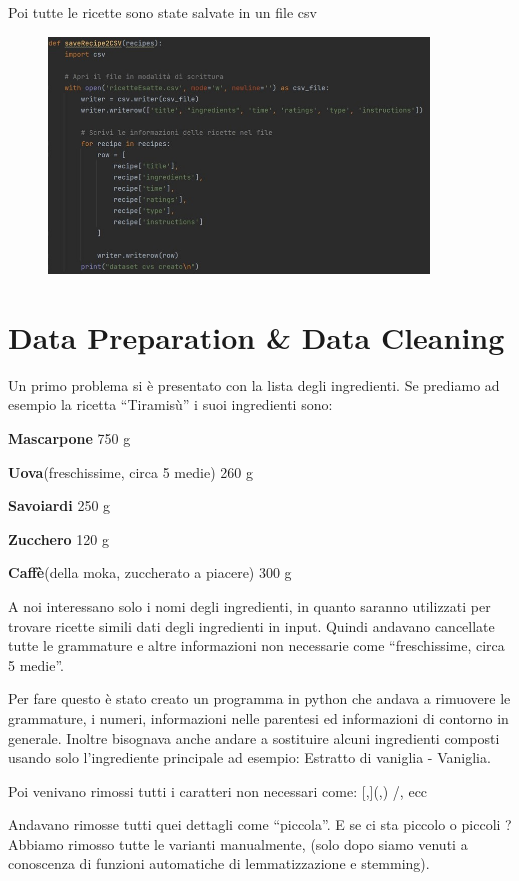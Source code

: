 \documentclass[12pt]{report}
\begin{document}
Poi tutte le ricette sono state salvate in un file csv
    \begin{figure}[H]
        \centering
        {\includegraphics[width=0.9\textwidth]{img/img3.jpg}}
    \end{figure}


\section{Data Preparation \& Data Cleaning}
Un primo problema si è presentato con la lista degli ingredienti. Se prediamo ad esempio la ricetta “Tiramisù” i suoi ingredienti sono: 

\textbf{Mascarpone} 750 g

\textbf{Uova}(freschissime, circa 5 medie) 260 g

\textbf{Savoiardi} 250 g

\textbf{Zucchero} 120 g

\textbf{Caffè}(della moka, zuccherato a piacere) 300 g

A noi interessano solo i nomi degli ingredienti, in quanto saranno utilizzati per trovare ricette simili dati degli ingredienti in input. Quindi andavano cancellate tutte le grammature e altre informazioni non necessarie come “freschissime, circa 5 medie”.

Per fare questo è stato creato un programma in python che andava a rimuovere le grammature, i numeri, informazioni nelle parentesi ed informazioni di contorno in generale. Inoltre bisognava anche andare a sostituire alcuni ingredienti composti usando solo l’ingrediente principale ad esempio: Estratto di vaniglia -\> Vaniglia. 

Poi venivano rimossi tutti i caratteri non necessari come: [,](,) /, ecc

Andavano rimosse tutti quei dettagli come “piccola”. E se ci sta piccolo o piccoli ? Abbiamo rimosso tutte le varianti manualmente, (solo dopo siamo venuti a conoscenza di funzioni automatiche di lemmatizzazione e stemming).
\end{document}
